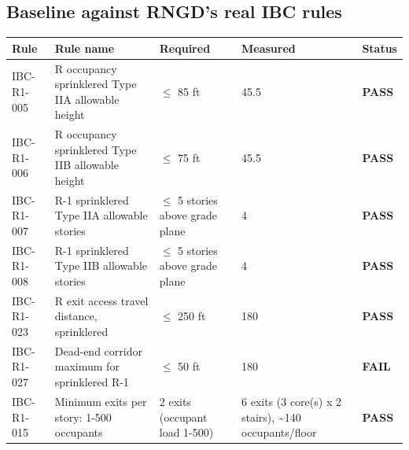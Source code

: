 \documentclass[10pt]{article}
\begin{document}
\subsection{Baseline against RNGD's real IBC rules}
{\small \begin{longtable}{p{1.8cm}p{6.2cm}p{2.4cm}p{2.4cm}p{1.4cm}}
\toprule
\textbf{Rule} & \textbf{Rule name} & \textbf{Required} & \textbf{Measured} & \textbf{Status} \\ \midrule \endhead
IBC-R1-005 & R occupancy sprinklered Type IIA allowable height & $\le$ 85 ft & 45.5 & \textcolor{pass}{\textbf{PASS}} \\
IBC-R1-006 & R occupancy sprinklered Type IIB allowable height & $\le$ 75 ft & 45.5 & \textcolor{pass}{\textbf{PASS}} \\
IBC-R1-007 & R-1 sprinklered Type IIA allowable stories & $\le$ 5 stories above grade plane & 4 & \textcolor{pass}{\textbf{PASS}} \\
IBC-R1-008 & R-1 sprinklered Type IIB allowable stories & $\le$ 5 stories above grade plane & 4 & \textcolor{pass}{\textbf{PASS}} \\
IBC-R1-023 & R exit access travel distance, sprinklered & $\le$ 250 ft & 180 & \textcolor{pass}{\textbf{PASS}} \\
IBC-R1-027 & Dead-end corridor maximum for sprinklered R-1 & $\le$ 50 ft & 180 & \textcolor{fail}{\textbf{FAIL}} \\
IBC-R1-015 & Minimum exits per story: 1-500 occupants & 2 exits (occupant load 1-500) & 6 exits (3 core(s) x 2 stairs), \textasciitilde{}140 occupants/floor & \textcolor{pass}{\textbf{PASS}} \\
\bottomrule
\end{longtable}}
\end{document}
